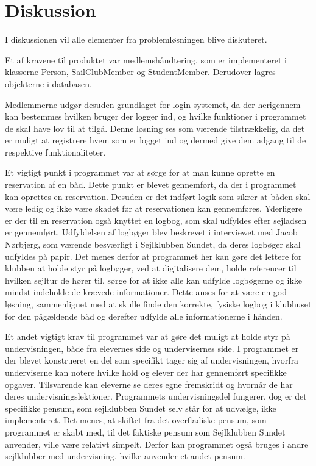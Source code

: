 \chapter{Diskussion}

I diskussionen vil alle elementer fra problemløsningen blive diskuteret.

Et af kravene til produktet var medlemshåndtering, som er implementeret i klasserne Person, SailClubMember og StudentMember. 
Derudover lagres objekterne i databasen. 

Medlemmerne udgør desuden grundlaget for login-systemet, da der herigennem kan bestemmes hvilken bruger der logger ind, og hvilke funktioner i programmet de skal have lov til at tilgå.  
Denne løsning ses som værende tilstrækkelig, da det er muligt at registrere hvem som er logget ind og dermed give dem adgang til de respektive funktionaliteter. 

Et vigtigt punkt i programmet var at sørge for at man kunne oprette en reservation af en båd. 
Dette punkt er blevet gennemført, da der i programmet kan oprettes en reservation. 
Desuden er det indført logik som sikrer at båden skal være ledig og ikke være skadet før at reservationen kan gennemføres. 
Yderligere er der til en reservation også knyttet en logbog, som skal udfyldes efter sejladsen er gennemført. 
Udfyldelsen af logbøger blev beskrevet i interviewet med Jacob Nørbjerg, som værende besværligt i Sejlklubben Sundet, da deres logbøger skal udfyldes på papir. 
Det menes derfor at programmet her kan gøre det lettere for klubben at holde styr på logbøger, ved at digitalisere dem, holde referencer til hvilken sejltur de hører til, sørge for at ikke alle kan udfylde logbøgerne og ikke mindst indeholde de krævede informationer. 
Dette anses for at være en god løsning, sammenlignet med at skulle finde den korrekte, fysiske logbog i klubhuset for den pågældende båd og derefter udfylde alle informationerne i hånden. 

Et andet vigtigt krav til programmet var at gøre det muligt at holde styr på undervisningen, både fra elevernes side og undervisernes side. 
I programmet er der blevet konstrueret en del som specifikt tager sig af undervisningen, hvorfra underviserne kan notere hvilke hold og elever der har gennemført specifikke opgaver.
Tilsvarende kan eleverne se deres egne fremskridt og hvornår de har deres undervisningslektioner.
Programmets undervisningsdel fungerer, dog er det specifikke pensum, som sejlklubben Sundet selv står for at udvælge, ikke implementeret. 
Det menes, at skiftet fra det overfladiske pensum, som programmet er skabt med, til det faktiske pensum som Sejlklubben Sundet anvender, ville være relativt simpelt. 
Derfor kan programmet også bruges i andre sejlklubber med undervisning, hvilke anvender et andet pensum.

